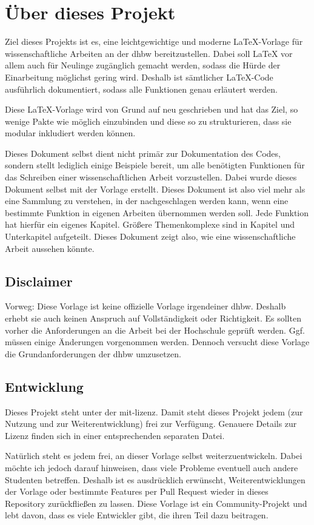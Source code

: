 
\chapter{Über dieses Projekt}
    
Ziel dieses Projekts ist es, eine leichtgewichtige und moderne 
\LaTeX{}-Vorlage für wissenschaftliche Arbeiten an der \ac{dhbw}
bereitzustellen. Dabei soll \LaTeX{} vor allem auch für Neulinge zugänglich 
gemacht werden, sodass die Hürde der Einarbeitung möglichst gering wird. 
Deshalb ist sämtlicher \LaTeX{}-Code ausführlich dokumentiert, sodass alle 
Funktionen genau erläutert werden.

Diese \LaTeX{}-Vorlage wird von Grund auf neu geschrieben und hat das Ziel, 
so wenige Pakte wie möglich einzubinden und diese so zu strukturieren, dass 
sie modular inkludiert werden können.

Dieses Dokument selbst dient nicht primär zur Dokumentation des Codes, 
sondern stellt lediglich einige Beispiele bereit, um alle benötigten 
Funktionen für das Schreiben einer wissenschaftlichen Arbeit vorzustellen.
Dabei wurde dieses Dokument selbst mit der Vorlage erstellt.
Dieses Dokument ist also viel mehr als eine Sammlung zu verstehen, in der
nachgeschlagen werden kann, wenn eine bestimmte Funktion in eigenen
Arbeiten übernommen werden soll. Jede Funktion hat hierfür ein eigenes 
Kapitel. Größere Themenkomplexe sind in Kapitel und Unterkapitel 
aufgeteilt. Dieses Dokument zeigt also, wie eine wissenschaftliche Arbeit
aussehen könnte.

\section{Disclaimer}

Vorweg: Diese Vorlage ist keine offizielle Vorlage irgendeiner \ac{dhbw}.
Deshalb erhebt sie auch keinen Anspruch auf Vollständigkeit oder
Richtigkeit. Es sollten vorher die Anforderungen an die Arbeit bei der
Hochschule geprüft werden. Ggf. müssen einige Änderungen vorgenommen werden.
Dennoch versucht diese Vorlage die Grundanforderungen der \ac{dhbw}
umzusetzen.

\section{Entwicklung}

Dieses Projekt steht unter der \Gls{mit-lizenz}. Damit steht dieses Projekt
jedem (zur Nutzung und zur Weiterentwicklung) frei zur Verfügung. Genauere
Details zur Lizenz finden sich in einer entsprechenden separaten Datei.

Natürlich steht es jedem frei, an dieser Vorlage selbst weiterzuentwickeln.
Dabei möchte ich jedoch darauf hinweisen, dass viele Probleme eventuell auch
andere Studenten betreffen. Deshalb ist es ausdrücklich erwünscht,
Weiterentwicklungen der Vorlage oder bestimmte Features per Pull Request
wieder in dieses Repository zurückfließen zu lassen. Diese Vorlage ist ein
Community-Projekt und lebt davon, dass es viele Entwickler gibt, die ihren
Teil dazu beitragen.